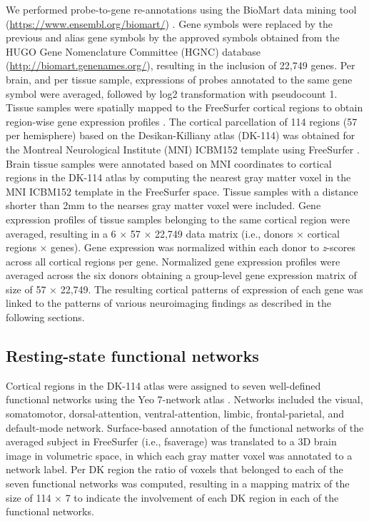 \begin{refsection}
We performed probe-to-gene re-annotations using the BioMart data mining tool (\url{https://www.ensembl.org/biomart/}) \citep{Arnatkeviciute2019APG}. Gene symbols were replaced by the previous and alias gene symbols by the approved symbols obtained from the HUGO Gene Nomenclature Committee (HGNC) database (\url{http://biomart.genenames.org/}), resulting in the inclusion of 22,749 genes. Per brain, and per tissue sample, expressions of probes annotated to the same gene symbol were averaged, followed by log2 transformation with pseudocount 1. Tissue samples were spatially mapped to the FreeSurfer cortical regions to obtain region-wise gene expression profiles \citep{French2015AFV}. The cortical parcellation of 114 regions (57 per hemisphere) based on the Desikan-Killiany atlas (DK-114) was obtained for the Montreal Neurological Institute (MNI) ICBM152 template using FreeSurfer \citep{CAMMOUN2012386,DESIKAN2006968,FISCHL2012Freesurfer,Fonov2011UnbiasedAA,Fonov2009UnbiasedNA}. Brain tissue samples were annotated based on MNI coordinates to cortical regions in the DK-114 atlas by computing the nearest gray matter voxel in the MNI ICBM152 template in the FreeSurfer space. Tissue samples with a distance shorter than 2mm to the nearses gray matter voxel were included. Gene expression profiles of tissue samples belonging to the same cortical region were averaged, resulting in a 6 × 57 × 22,749 data matrix (i.e., donors × cortical regions × genes). Gene expression was normalized within each donor to \textit{z}-scores across all cortical regions per gene. Normalized gene expression profiles were averaged across the six donors obtaining a group-level gene expression matrix of size of 57 × 22,749. The resulting cortical patterns of expression of each gene was linked to the patterns of various neuroimaging findings as described in the following sections.


\subsection*{Resting-state functional networks}
Cortical regions in the DK-114 atlas were assigned to seven well-defined functional networks \citep{Power2011FunctionalNO,smith2009correspondence,thomas2011organization} using the Yeo 7-network atlas \citep{thomas2011organization}. Networks included the visual, somatomotor, dorsal-attention, ventral-attention, limbic, frontal-parietal, and default-mode network. Surface-based annotation of the functional networks of the averaged subject in FreeSurfer (i.e., fsaverage) was translated to a 3D brain image in volumetric space, in which each gray matter voxel was annotated to a network label. Per DK region the ratio of voxels that belonged to each of the seven functional networks was computed, resulting in a mapping matrix of the size of 114 × 7 to indicate the involvement of each DK region in each of the functional networks.


\end{refsection}
